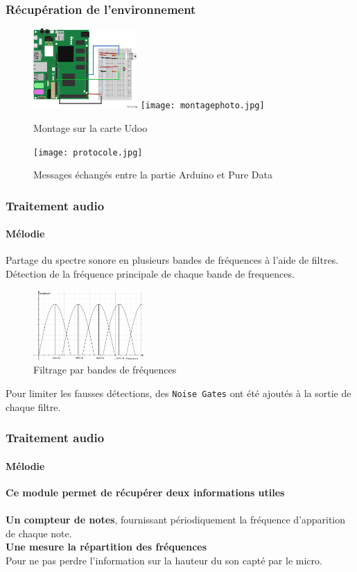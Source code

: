 \documentclass{beamer}
\begin{document}
\begin{frame}
\frametitle{Récupération de l'environnement}
\begin{figure}
  \centering
  \includegraphics[width=150px]{montage.jpg}  
  \hspace{15px}
  \texttt{[image: montagephoto.jpg]} 
	\caption{Montage sur la carte Udoo}
\end{figure}
\begin{figure}
\centering
\vspace{-0.5cm}
\texttt{[image: protocole.jpg]}
\caption{Messages échangés entre la partie Arduino et Pure Data}
\end{figure}
\end{frame}

\begin{frame}
\frametitle{Traitement audio}
\framesubtitle{Mélodie}

Partage du spectre sonore en plusieurs bandes de fréquences à l'aide de filtres.\\
Détection de la fréquence principale de chaque bande de frequences.
\begin{figure}
\centering
\includegraphics[height=100px]{filtre.jpg}
\caption{Filtrage par bandes de fréquences}
\end{figure}
Pour limiter les fausses détections, des \texttt{Noise Gates} ont été ajoutés à la sortie de chaque filtre. 
\end{frame}


\begin{frame}
\frametitle{Traitement audio}
\framesubtitle{Mélodie}
\textbf{Ce module permet de récupérer deux informations utiles}\\\\
\textbf{Un compteur de notes}, fournissant périodiquement la fréquence d'apparition de chaque note.
\\ 
\textbf{Une mesure la répartition des fréquences}\\
Pour ne pas perdre l'information sur la hauteur du son capté par le micro.
\end{frame}
\end{document}
